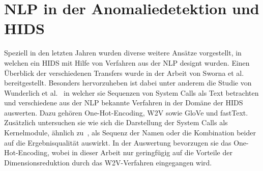         

\section{NLP in der Anomaliedetektion und HIDS}\label{sec:related_nlp}

        Speziell in den letzten Jahren wurden diverse weitere Ansätze vorgestellt, in welchen ein \ac{HIDS} mit Hilfe von Verfahren aus der \ac{NLP} designt wurden.
        Einen Überblick der verschiedenen Transfers wurde in der Arbeit von Sworna et al.~\cite{NLPHIDSSWORNA2022} bereitgestellt.
        Besonders hervorzuheben ist dabei unter anderem die Studie von Wunderlich et al.~\cite{W2VWUNDERLICH2019} in welcher sie Sequenzen von System Calls als Text betrachten und verschiedene aus der \ac{NLP} bekannte Verfahren in der Domäne der \ac{HIDS} auswerten.
        Dazu gehören One-Hot-Encoding, \ac{W2V} sowie GloVe und fastText. 
        Zusätzlich untersuchen sie wie sich die Darstellung der System Calls als Kernelmodule, ähnlich zu~\cite{SYSTEM_STATES}, als Sequenz der Namen oder die Kombination beider auf die Ergebnisqualität auswirkt.
        In der Auswertung bevorzugen sie das One-Hot-Encoding, wobei in dieser Arbeit nur geringfügig auf die Vorteile der Dimensionsreduktion durch das \ac{W2V}-Verfahren eingegangen wird.

